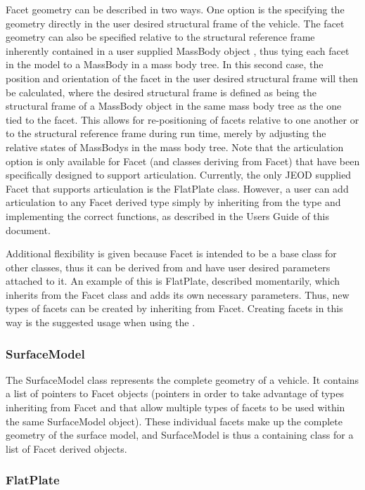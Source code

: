 Facet geometry can be described in two ways. One option is the specifying the
geometry directly in the user desired structural frame of the vehicle.
The facet geometry can also be
specified relative to the structural reference frame inherently contained
in a user supplied MassBody object \cite{dynenv:MASS}, thus tying
each facet in the model to a MassBody in a mass body tree. In this second case,
the position and orientation of the facet in the user desired structural frame
will then be calculated, where the desired structural frame is
defined as being the structural frame of a MassBody object in the same
mass body tree as the one tied to the facet. This allows for re-positioning
of facets relative to one another or to the structural reference frame during run time,
merely by adjusting the relative states of MassBodys in the mass body tree.
Note that the articulation option is only available for Facet (and classes
deriving from Facet) that have been specifically designed to support
articulation. Currently, the only JEOD supplied Facet that supports
articulation is the FlatPlate class. However, a user can
add articulation to any Facet derived type
simply by inheriting from the type and implementing the
correct functions, as described in the Users Guide of this
document.

Additional flexibility is
given because Facet is intended to be a base class for other classes, thus
it can be derived from and have user desired parameters attached to it. An
example of this is FlatPlate, described momentarily, which inherits from
the Facet class and adds its own necessary parameters. Thus, new types
of facets can be created by inheriting from Facet. Creating facets in
this way is the suggested usage when using the
\ModelDesc.

\subsubsection{SurfaceModel}

The SurfaceModel class represents the complete geometry of a vehicle. It
contains a list of pointers to Facet objects (pointers in order to take advantage
of types inheriting from Facet and that allow multiple types of facets
to be used within the same SurfaceModel object). These individual facets 
make up the
complete geometry of the surface model, and SurfaceModel is thus a containing
class for a list of Facet derived objects.

\subsubsection{FlatPlate}

